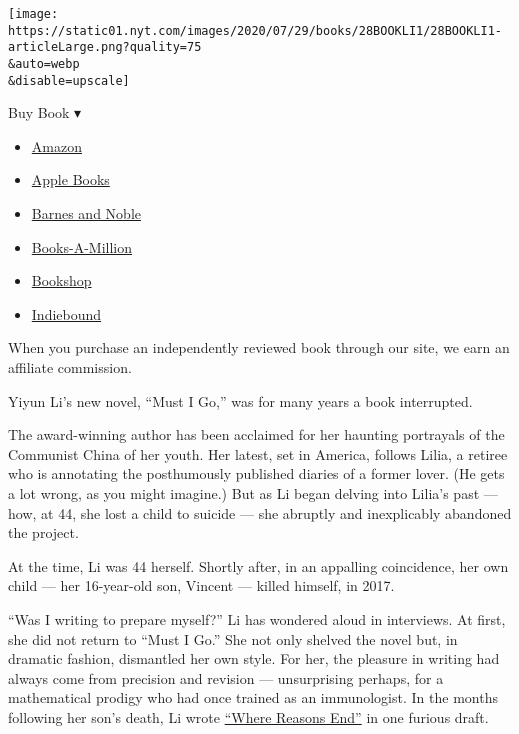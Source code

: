 \texttt{[image: https://static01.nyt.com/images/2020/07/29/books/28BOOKLI1/28BOOKLI1-articleLarge.png?quality=75\\\&auto=webp\\\&disable=upscale]}

Buy Book ▾

\begin{itemize}
\tightlist
\item
  \href{https://www.amazon.com/gp/search?index=books\&tag=NYTBSREV-20\&field-keywords=Must+I+Go+Yiyun+Li}{Amazon}
\item
  \href{https://du-gae-books-dot-nyt-du-prd.appspot.com/buy?title=Must+I+Go\&author=Yiyun+Li}{Apple
  Books}
\item
  \href{https://www.anrdoezrs.net/click-7990613-11819508?url=https\%3A\%2F\%2Fwww.barnesandnoble.com\%2Fw\%2F\%3Fean\%3D9780399589126}{Barnes
  and Noble}
\item
  \href{https://www.anrdoezrs.net/click-7990613-35140?url=https\%3A\%2F\%2Fwww.booksamillion.com\%2Fp\%2FMust\%2BI\%2BGo\%2FYiyun\%2BLi\%2F9780399589126}{Books-A-Million}
\item
  \href{https://bookshop.org/a/3546/9780399589126}{Bookshop}
\item
  \href{https://www.indiebound.org/book/9780399589126?aff=NYT}{Indiebound}
\end{itemize}

When you purchase an independently reviewed book through our site, we
earn an affiliate commission.

Yiyun Li's new novel, ``Must I Go,'' was for many years a book
interrupted.

The award-winning author has been acclaimed for her haunting portrayals
of the Communist China of her youth. Her latest, set in America, follows
Lilia, a retiree who is annotating the posthumously published diaries of
a former lover. (He gets a lot wrong, as you might imagine.) But as Li
began delving into Lilia's past --- how, at 44, she lost a child to
suicide --- she abruptly and inexplicably abandoned the project.

At the time, Li was 44 herself. Shortly after, in an appalling
coincidence, her own child --- her 16-year-old son, Vincent --- killed
himself, in 2017.

``Was I writing to prepare myself?'' Li has wondered aloud in
interviews. At first, she did not return to ``Must I Go.'' She not only
shelved the novel but, in dramatic fashion, dismantled her own style.
For her, the pleasure in writing had always come from precision and
revision --- unsurprising perhaps, for a mathematical prodigy who had
once trained as an immunologist. In the months following her son's
death, Li wrote
\href{https://www.nytimes.com/2019/01/22/books/review-where-reasons-end-yiyun-li.html}{``Where
Reasons End''} in one furious draft.

